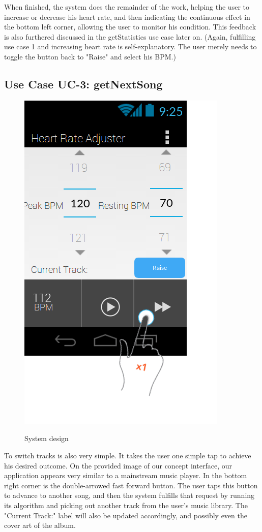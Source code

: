 \documentclass[letterpaper,english, 12pt]{scrreprt}
\begin{document}
When finished, the system does the remainder of the work, helping the user to increase or decrease his heart rate, and then indicating the continuous effect in the bottom left corner, allowing the user to monitor his condition. This feedback is also furthered discussed in the getStatistics use case later on. (Again, fulfilling use case 1 and increasing heart rate is self-explanatory. The user merely needs to toggle the button back to "Raise" and select his BPM.)

\subsection{Use Case UC-3: getNextSong}

\begin{figure}[H]
	\centering
	\includegraphics{img/Prelim_Design/PrelimDesign_2.png}\\
	\caption{System design}
\end{figure}

To switch tracks is also very simple. It takes the user one simple tap to achieve his desired outcome. On the provided image of our concept interface, our application appears very similar to a mainstream music player. In the bottom right corner is the double-arrowed fast forward button. The user taps this button to advance to another song, and then the system fulfills that request by running its algorithm and picking out another track from the user's music library. The "Current Track:" label will also be updated accordingly, and possibly even the cover art of the album.
\end{document}
